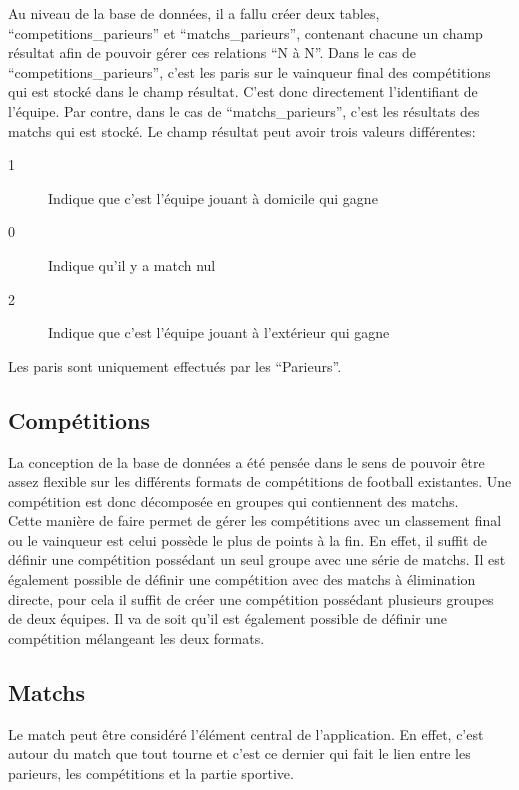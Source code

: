 \documentclass[10pt,a4paper,titlepage]{article}
\begin{document}
Au niveau de la base de données, il a fallu créer deux tables, “competitions\_parieurs” et “matchs\_parieurs”, contenant chacune un champ résultat afin de pouvoir gérer ces relations “N à N”. Dans le cas de “competitions\_parieurs”, c'est les paris sur le vainqueur final des compétitions qui est stocké dans le champ résultat. C'est donc directement l'identifiant de l'équipe. Par contre, dans le cas de “matchs\_parieurs”, c'est les résultats des matchs qui est stocké. Le champ résultat peut avoir trois valeurs différentes:
\begin{description}
	\item [1] {Indique que c'est l'équipe jouant à domicile qui gagne}
	\item [0] {Indique qu'il y a match nul}
	\item [2] {Indique que c'est l'équipe jouant à l'extérieur qui gagne\\}
\end{description}

Les paris sont uniquement effectués par les “Parieurs”.

\subsection{Compétitions}
La conception de la base de données a été pensée dans le sens de pouvoir être assez flexible sur les différents formats de compétitions de football existantes. Une compétition est donc décomposée en groupes qui contiennent des matchs.\\

Cette manière de faire permet de gérer les compétitions avec un classement final ou le vainqueur est celui possède le plus de points à la fin. En effet, il suffit de définir une compétition possédant un seul groupe avec une série de matchs. Il est également possible de définir une compétition avec des matchs à élimination directe, pour cela il suffit de créer une compétition possédant plusieurs groupes de deux équipes. Il va de soit qu'il est également possible de définir une compétition mélangeant les deux formats.

\subsection{Matchs}
Le match peut être considéré l'élément central de l'application. En effet, c'est autour du match que tout tourne et c'est ce dernier qui fait le lien entre les parieurs, les compétitions et la partie sportive.\\
\end{document}
